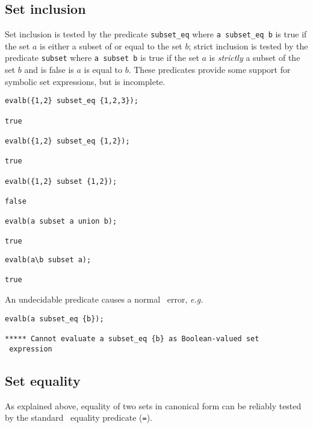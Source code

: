 \subsection{Set inclusion}

Set inclusion is tested by the predicate {\tt subset\_eq}
 where {\tt a subset\_eq b} is true if the set $a$
is either a subset of or equal to the set $b$; strict inclusion is
tested by the predicate {\tt subset}
where {\tt a subset b} is true if the set $a$ is {\em strictly\/} a
subset of the set $b$ and is false is $a$ is equal to $b$.  These
predicates provide some support for symbolic set expressions, but is
incomplete.
\begin{verbatim}
evalb({1,2} subset_eq {1,2,3});

true

evalb({1,2} subset_eq {1,2});

true

evalb({1,2} subset {1,2});

false

evalb(a subset a union b);

true
\end{verbatim}
\newpage
\begin{verbatim}
evalb(a\b subset a);

true
\end{verbatim}

An undecidable predicate causes a normal \REDUCE\ error, {\em e.g.\ }
\begin{verbatim}
evalb(a subset_eq {b});

***** Cannot evaluate a subset_eq {b} as Boolean-valued set
 expression

\end{verbatim}


\subsection{Set equality}

As explained above, equality of two sets in canonical form can be
reliably tested by the standard \REDUCE\ equality predicate ({\tt =}).

